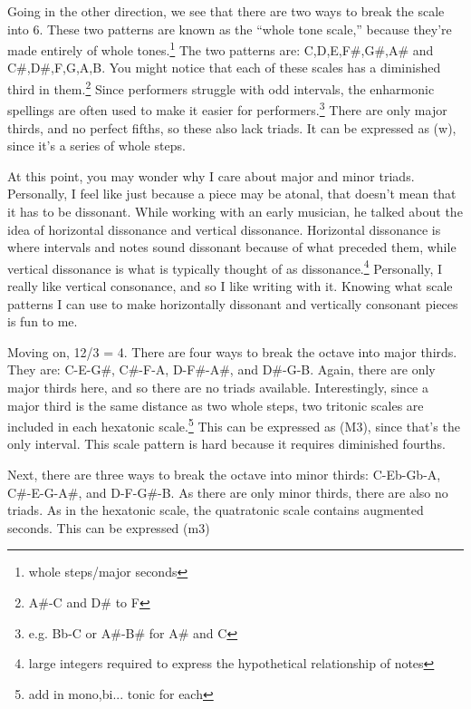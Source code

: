 \documentclass[12pt]{article}[titlepage]
\newcommand{\say}[1]{``#1''}
\newcommand{\1}{\={a}}
\newcommand{\2}{\={e}}
\newcommand{\3}{\={\i}}
\newcommand{\4}{\=o}
\newcommand{\5}{\=u}
\newcommand{\6}{\={A}}
\renewcommand{\,}{\textsuperscript{,}}
\begin{document}
Going in the other direction, we see that there are two ways to break the scale into 6.
These two patterns are known as the \say{whole tone scale,} because they're made entirely of whole tones.\footnote{whole steps/major seconds}
The two patterns are: C,D,E,F\#,G\#,A\# and C\#,D\#,F,G,A,B.
You might notice that each of these scales has a diminished third in them.\footnote{A\#-C and D\# to F}
Since performers struggle with odd intervals, the enharmonic spellings are often used to make it easier for performers.\footnote{e.g. Bb-C or A\#-B\# for A\# and C}
There are only major thirds, and no perfect fifths, so these also lack triads.
It can be expressed as (w), since it's a series of whole steps.

At this point, you may wonder why I care about major and minor triads.
Personally, I feel like just because a piece may be atonal, that doesn't mean that it has to be dissonant.
While working with an early musician, he talked about the idea of horizontal dissonance and vertical dissonance.
Horizontal dissonance is where intervals and notes sound dissonant because of what preceded them, while vertical dissonance is what is typically thought of as dissonance.\footnote{large integers required to express the hypothetical relationship of notes}
Personally, I really like vertical consonance, and so I like writing with it.
Knowing what scale patterns I can use to make horizontally dissonant and vertically consonant pieces is fun to me.

Moving on, 12/3 = 4.
There are four ways to break the octave into major thirds.
They are: C-E-G\#, C\#-F-A, D-F\#-A\#, and D\#-G-B.
Again, there are only major thirds here, and so there are no triads available.
Interestingly, since a major third is the same distance as two whole steps, two tritonic scales are included in each hexatonic scale.\footnote{add in mono,bi... tonic for each}
This can be expressed as (M3), since that's the only interval.
This scale pattern is hard because it requires diminished fourths.

Next, there are three ways to break the octave into minor thirds: C-Eb-Gb-A, C\#-E-G-A\#, and D-F-G\#-B.
As there are only minor thirds, there are also no triads.
As in the hexatonic scale, the quatratonic scale contains augmented seconds.
This can be expressed (m3)
\end{document}
